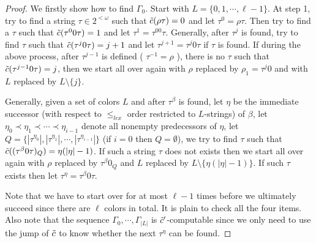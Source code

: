 \begin{proof}
We firstly show how to find $\Gamma_0$.
Start with $L = \{0,1,\cdots,\ell-1\}$.
At step 1, try to find a string $\tau\in 2^{<\omega}$ such that
$\tilde{c}(\rho\tau) =  0$ and
let $\tau^0 = \rho\tau$. Then
try to find a $\tau$ such that
$\tilde{c}(\tau^00\tau) = 1$ and
let $\tau^1 = \tau^00\tau$. Generally, after $\tau^j$ is found,
try to find $\tau$ such that
$\tilde{c}(\tau^j0\tau)=j+1$
and let $\tau^{j+1} = \tau^j0\tau$ if
$\tau$ is found.
If during the above process, after $\tau^{j-1}$ is
defined ( $\tau^{-1} = \rho$ ),
there is no $\tau$ such that
$\tilde{c}(\tau^{j-1}0\tau) = j$,
then we start all over again
with $\rho$ replaced by $\rho_1 =
\tau^j0$ and with $L$ replaced by $ L \setminus \{j\}$.

%
%

Generally, given a set of colors $L$ and after $\tau^{\beta}$ is found,
let $\eta$
be the immediate successor (with respect to $\leq_{lex}$ order restricted to $L$-strings)
 of $\beta$,
let $\eta_0\prec\eta_1\prec\cdots\prec\eta_{i-1}$ denote
all nonempty predecessors of $\eta$, let
$Q = \big\{|\tau^{\eta_0}|,|\tau^{\eta_1}|,
\cdots,|\tau^{\eta_{i-1}}|\big\}$
(if $i=0$ then $Q=\emptyset$),
we try to find $\tau$ such that
$\tilde{c}((\tau^{\beta}0\tau)_{Q}) = \eta(|\eta|-1)$.
If such a string $\tau$ does not exists then we
start  all over again with $\rho $
replaced by  $\tau^\beta0_{Q}$ and $L$ replaced by $L \setminus \{\eta(|\eta|-1)\}$.
If such $\tau$ exists then let $\tau^\eta =
\tau^\beta0\tau$.

Note that we have to
start over for at most $\ell-1$ times before we
ultimately succeed since
there are $\ell$ colors in total.
It is plain to check all the four items.
Also note that the sequence $\Gamma_0,\cdots,\Gamma_{|L|}$ is
$\tilde{c}'$-computable since we only need to
use the jump of $\tilde{c}$ to know whether the next $\tau^{\eta}$ can
 be found.



\end{proof}


